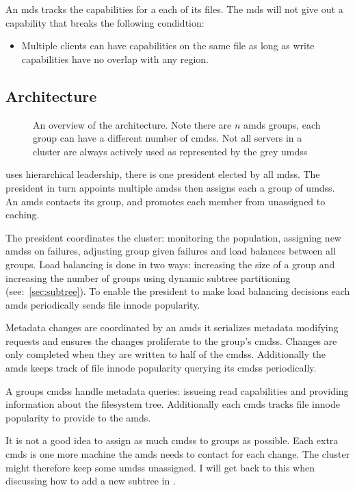 \begin{samepage}
An \ac{mds} tracks the capabilities for a each of its files. The \ac{mds} will not give out a capability that breaks the following condidtion:
%
\begin{itemize}
	\item Multiple clients can have capabilities on the same file as long as write capabilities have no overlap with any region.
\end{itemize}
\end{samepage}
% 
\subsection{Architecture} \label{sec:arch}
\begin{figure}
	
	\caption{An overview of the architecture. Note there are $n$ \acf{amds} groups, each group can have a different number of \acfp{cmds}. Not all servers in a cluster are always actively used as represented by the grey \acfp{umds}}
\end{figure}

\Name{} uses hierarchical leadership, there is one president elected by all \acp{mds}. The president in turn appoints multiple \acfp{amds} then assigns each a group of \acfp{umds}. An \ac{amds} contacts its group, and promotes each member from unassigned to caching. 

The president coordinates the cluster: monitoring the population, assigning new \acp{amds} on failures, adjusting group given failures and load balances between all groups. Load balancing is done in two ways: increasing the size of a group and increasing the number of groups using dynamic subtree partitioning~\cite{ceph} (see:~\cref{sec:subtree}). To enable the president to make load balancing decisions each \ac{amds} periodically sends file innode popularity.

Metadata changes are coordinated by an \ac{amds} it serializes metadata modifying requests and ensures the changes proliferate to the group's \acp{cmds}. Changes are only completed when they are written to half of the \acp{cmds}. Additionally the \ac{amds} keeps track of file innode popularity querying its \acp{cmds} periodically.

A groups \acp{cmds} handle metadata queries: issueing read capabilities and providing information about the filesystem tree. Additionally each \ac{cmds} tracks file innode popularity to provide to the \ac{amds}. 

It is not a good idea to assign as much \acp{cmds} to groups as possible. Each extra \ac{cmds} is one more machine the \ac{amds} needs to contact for each change. The cluster might therefore keep some \acp{umds} unassigned. I will get back to this when discussing how to add a new subtree in .
%
